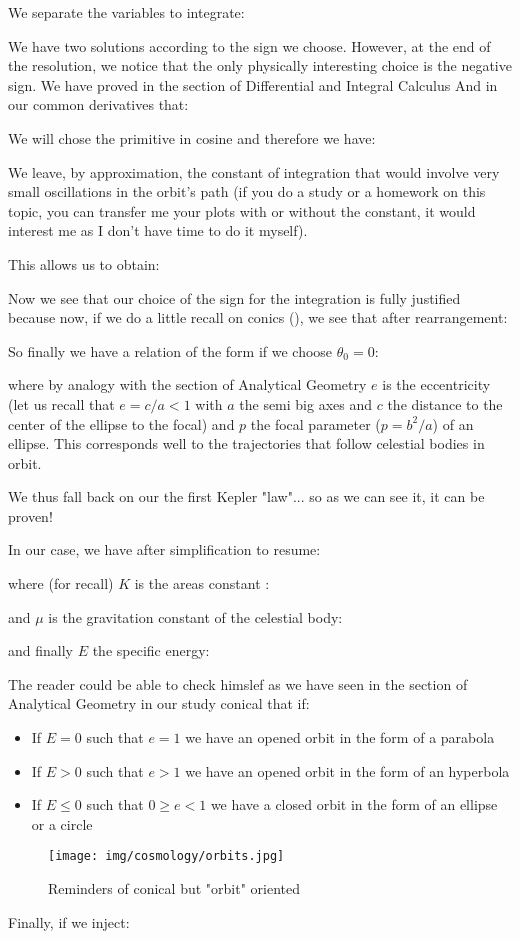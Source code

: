 	We separate the variables to integrate:
	
	We have two solutions according to the sign we choose. However, at the end of the resolution, we notice that the only physically interesting choice is the negative sign. We have proved in the section of Differential and Integral Calculus And in our common derivatives that:
	
	We will chose the primitive in cosine and therefore we have:
	
	We leave, by approximation, the constant of integration that would involve very small oscillations in the orbit's path (if you do a study or a homework on this topic, you can transfer me your plots with or without the constant, it would interest me as I don't  have time to do it myself).

	This allows us to obtain:
	
	Now we see that our choice of the sign for the integration is fully justified because now, if we do a little recall on conics (), we see that after rearrangement:
	
	So finally we have a relation of the form if we choose $\theta_0=0$:
	
	where by analogy with the section of Analytical Geometry $e$ is the eccentricity (let us recall that $e=c/a<1$ with $a$ the semi big axes and $c$ the distance to the center of the ellipse to the focal) and $p$ the focal parameter ($p=b^2/a$) of an ellipse. This corresponds well to the trajectories that follow celestial bodies in orbit.
	
	We thus fall back on our the first  Kepler "law"... so as we can see it, it can be proven!

	In our case, we have after simplification to resume:
	
	where (for recall) $K$ is the areas constant :
	
	and $\mu$ is the gravitation constant of the celestial body:
	
	and finally $E$ the specific energy:
	
	The reader could be able to check himslef as we have seen in the section of Analytical Geometry in our study conical that if:
	\begin{itemize}
		\item If $E=0$ such that $e=1$ we have an opened orbit in the form of a parabola

		\item If $E>0$ such that $e>1$ we have an opened orbit in the form of an hyperbola

		\item If $E\leq 0$ such that $0\geq e <1$ we have a closed orbit in the form of an ellipse or a circle
	\end{itemize}
	\begin{figure}[H]
		\begin{center}
		\texttt{[image: img/cosmology/orbits.jpg]}
		\end{center}	
		\caption[]{Reminders of conical but "orbit" oriented}
	\end{figure}
	Finally, if we inject:
	

